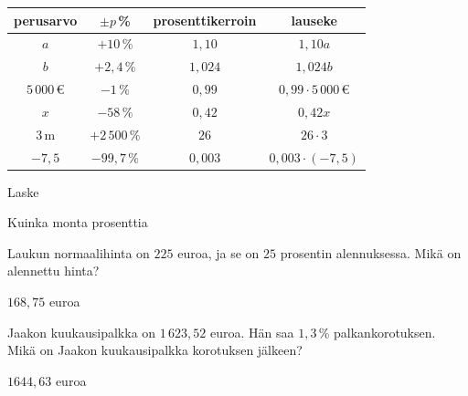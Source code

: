 \begin{tehtavasivu}
\begin{tehtava}
	\begin{vastaus}
\begin{tabular}{|c|c|c|c|}
\hline 
perusarvo & $\pm p$\,\% & prosenttikerroin & lauseke \\ 
\hline 
$a$ & $+10$\,\% & $1,10$ & $1,10a$ \\ 
\hline 
$b$ & $+2,4$\,\% &$1,024$ &$1,024b$ \\ 
\hline 
$5\,000$\,€ & $-1\,\%$& $0,99$ &$0,99\cdot5\,000\,€$ \\ 
\hline 
$x$ &$-58\,\%$ &$0,42$ & $0,42x$ \\ 
\hline 
 $3$\,m&$+2\,500\,\%$ & $26$ &$26\cdot3$ \\ 
 \hline
 $-7,5$ & $-99,7\,\%$&$0,003$ &$0,003\cdot(-7,5)$ \\
  \hline %
\end{tabular}
	\end{vastaus}
\end{tehtava}

\begin{tehtava}
    Laske
    \begin{vastaus}
    \end{vastaus}
\end{tehtava}

\begin{tehtava}
    Kuinka monta prosenttia
    \begin{vastaus}
    \end{vastaus}
\end{tehtava}


\begin{tehtava}
    Laukun normaalihinta on $225$ euroa, ja se on $25$ prosentin alennuksessa. Mikä on alennettu hinta?
    \begin{vastaus}
        $168,75$ euroa
    \end{vastaus}
\end{tehtava}

\begin{tehtava}
    Jaakon kuukausipalkka on $1\,623,52$ euroa. Hän saa $1,3\,\%$ palkankorotuksen. Mikä on Jaakon kuukausipalkka korotuksen jälkeen?
    \begin{vastaus}
        $1644,63$ euroa
    \end{vastaus}
\end{tehtava}


\end{tehtavasivu}
